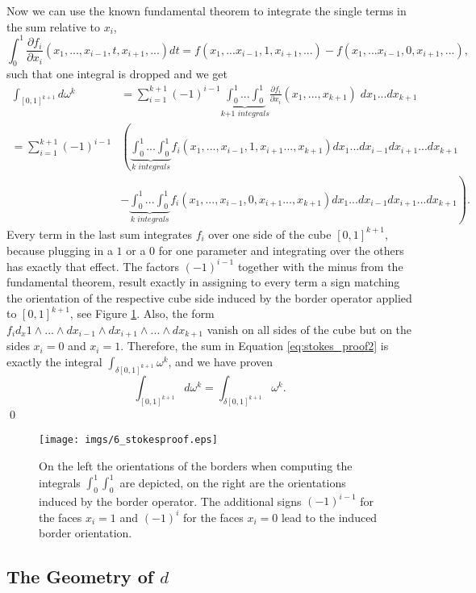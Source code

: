 Now we can use the known fundamental theorem to integrate the single terms in the sum relative to $x_i$,
\[\int_{0}^1 \frac{\partial f_i}{\partial x_i} (x_1,...,x_{i-1},t,x_{i+1},...) dt = f(x_1,...x_{i-1},1,x_{i+1},...) - f(x_1,...x_{i-1},0,x_{i+1},...),\]
such that one integral is dropped and we get 
\begin{align}\int_{[0,1]^{k+1}} d \omega^k &= \sum_{i=1}^{k+1}(-1)^{i-1} \underbrace{\int_{0}^1...\int_{0}^1}_{\textit{k+1 integrals}} \frac{\partial f_i}{\partial x_i}(x_1,...,x_{k+1})\; dx_1...dx_{k+1} \nonumber\\
= \sum_{i=1}^{k+1}(-1)^{i-1} &\left(\underbrace{\int_{0}^1...\int_{0}^1}_{\textit{k integrals}} f_i(x_1,...,x_{i-1},1,x_{i+1}...,x_{k+1}) dx_1...dx_{i-1}dx_{i+1}...dx_{k+1} \right. \nonumber\\
&- \left. \underbrace{\int_{0}^1...\int_{0}^1}_{\textit{k integrals}} f_i(x_1,...,x_{i-1},0,x_{i+1}...,x_{k+1}) dx_1...dx_{i-1}dx_{i+1}...dx_{k+1} \right). \label{eq:stokes_proof2}\end{align}
Every term in the last sum integrates $f_i$ over one side of the cube $[0,1]^{k+1}$, because plugging in a $1$ or a $0$ for one parameter and integrating over the others has exactly that effect. The factors $(-1)^{i-1}$ together with the minus from the fundamental theorem, result exactly in assigning to every term a sign matching the orientation of the respective cube side induced by the border operator applied to $[0,1]^{k+1}$, see Figure \ref{fig:6_stokesproof}.  Also, the form $f_i d_x1 \wedge... \wedge dx_{i-1} \wedge dx_{i+1}\wedge... \wedge dx_{k+1}$ vanish on all sides of the cube but on the sides  $x_i =  0$ and $x_i = 1$. Therefore, the sum in Equation \ref{eq:stokes_proof2} is exactly the integral $\int_{\delta [0,1]^{k+1}}\omega^k$, and we have proven
\[\int_{[0,1]^{k+1}} d \omega^k = \int_{\delta [0,1]^{k+1}}\omega^k.\]
\qed

\begin{figure}[t]%
\texttt{[image: imgs/6\_stokesproof.eps]}%
\caption{On the left the orientations of the borders when computing the integrals $\int_0^1\int_0^1$ are depicted, on the right are the orientations induced by the border operator. The additional signs $(-1)^{i-1}$ for the faces $x_i=1$ and $(-1)^{i}$ for the faces $x_i=0$ lead to the induced border orientation.}%
\label{fig:6_stokesproof}%
\end{figure}

\subsection{The Geometry of $d$}

